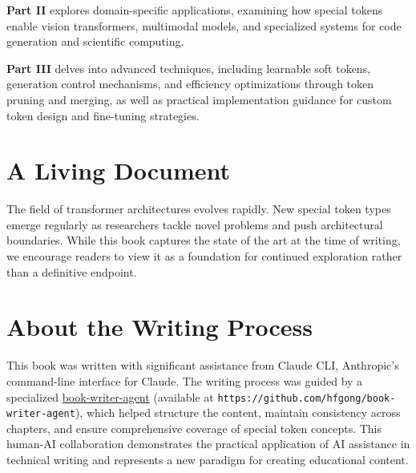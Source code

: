 \textbf{Part II} explores domain-specific applications, examining how special tokens enable vision transformers, multimodal models, and specialized systems for code generation and scientific computing.

\textbf{Part III} delves into advanced techniques, including learnable soft tokens, generation control mechanisms, and efficiency optimizations through token pruning and merging, as well as practical implementation guidance for custom token design and fine-tuning strategies.
\begin{comment}
Feedback: The description for Part III is a bit vague with "learnable soft tokens, generation control mechanisms". Can you be more specific? For example: "...delves into advanced techniques, such as using special tokens to steer text generation, implementing learnable 'soft prompts' for parameter-efficient fine-tuning, and optimizing inference speed through token pruning and merging."

STATUS: addressed - expanded Part III to include practical implementation content previously in Part IV
\end{comment}

\section*{A Living Document}

The field of transformer architectures evolves rapidly. New special token types emerge regularly as researchers tackle novel problems and push architectural boundaries. While this book captures the state of the art at the time of writing, we encourage readers to view it as a foundation for continued exploration rather than a definitive endpoint.
\begin{comment}
Feedback: This is a standard disclaimer. To make it more engaging, you could invite the reader to participate. For example: "We invite readers to join the conversation on the book's accompanying GitHub repository, where we will post updates and discuss new developments in the field." This turns a static statement into an active invitation.
\end{comment}

\section*{About the Writing Process}

This book was written with significant assistance from Claude CLI, Anthropic's command-line interface for Claude. The writing process was guided by a specialized \href{https://github.com/hfgong/book-writer-agent}{book-writer-agent} (available at \texttt{https://github.com/hfgong/book-writer-agent}), which helped structure the content, maintain consistency across chapters, and ensure comprehensive coverage of special token concepts. This human-AI collaboration demonstrates the practical application of AI assistance in technical writing and represents a new paradigm for creating educational content.


